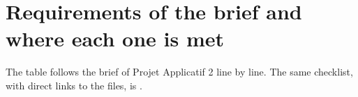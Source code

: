 \clearpage
\appendix
\renewcommand*{\sectionformat}{\textcolor{cgteal}{Appendix \thesection}\hspace{0.7em}}

\section{Requirements of the brief and where each one is met}
\label{app:trace}
\vspace{-0.45\baselineskip}{\color{cgrule}\rule{\textwidth}{0.6pt}}\par\vspace{0.15\baselineskip}
The table follows the brief of Projet Applicatif 2 line by line. The same checklist, with direct links to the
files, is .


